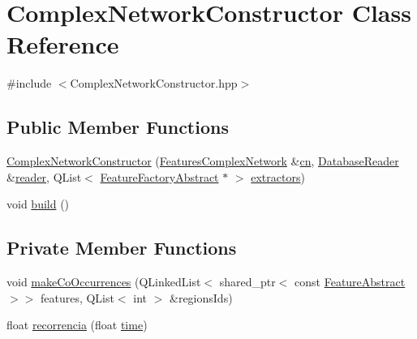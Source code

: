 \hypertarget{class_complex_network_constructor}{\section{Complex\+Network\+Constructor Class Reference}
\label{class_complex_network_constructor}
}


{\ttfamily \#include $<$Complex\+Network\+Constructor.\+hpp$>$}

\subsection*{Public Member Functions}
\begin{DoxyCompactItemize}
\item 
\hyperlink{class_complex_network_constructor_afe14ec2655225f646877381c87b86df3}{Complex\+Network\+Constructor} (\hyperlink{class_features_complex_network}{Features\+Complex\+Network} \&\hyperlink{class_complex_network_constructor_aa099456a58edc5c1885323061206b3e6}{cn}, \hyperlink{class_database_reader}{Database\+Reader} \&\hyperlink{class_complex_network_constructor_ad223ad7e464ff159d91a89deb4e943cc}{reader}, Q\+List$<$ \hyperlink{class_feature_factory_abstract}{Feature\+Factory\+Abstract} $\ast$ $>$ \hyperlink{class_complex_network_constructor_ae79b538a8b9253cd71de5fef1be1c18a}{extractors})
\item 
void \hyperlink{class_complex_network_constructor_a19d313488e2c19172e362b521f53e329}{build} ()
\end{DoxyCompactItemize}
\subsection*{Private Member Functions}
\begin{DoxyCompactItemize}
\item 
void \hyperlink{class_complex_network_constructor_a66d2992250ffcc2e4c9721a840f81378}{make\+Co\+Occurrences} (Q\+Linked\+List$<$ shared\+\_\+ptr$<$ const \hyperlink{class_feature_abstract}{Feature\+Abstract} $>$$>$ features, Q\+List$<$ int $>$ \&regions\+Ids)
\item 
float \hyperlink{class_complex_network_constructor_a8c4875120270d689a5fd08e47a6b4b59}{recorrencia} (float \hyperlink{class_complex_network_constructor_afc016404ca7dda4b05807e3ca004c308}{time})
\end{DoxyCompactItemize}
